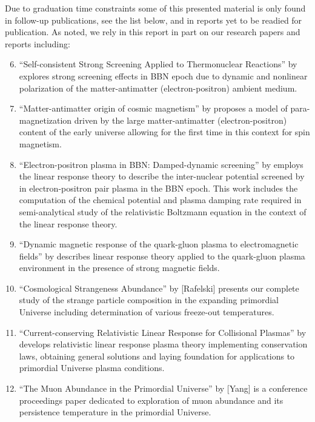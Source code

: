 Due to graduation time constraints some of this presented material is only found in follow-up publications, see the list below, and in reports yet to be readied for publication. As noted, we rely in this report in part on our research papers and reports including:
\begin{enumerate}
\setcounter{enumi}{5}
\item ``Self-consistent Strong Screening Applied to Thermonuclear Reactions'' by  explores strong screening effects in BBN epoch due to dynamic and nonlinear polarization of the matter-antimatter (electron-positron) ambient medium.
%
\item ``Matter-antimatter origin of cosmic magnetism'' by  proposes a model of para-magnetization driven by the large matter-antimatter (electron-positron) content of the early universe allowing for the first time in this context for spin magnetism.
%
\item ``Electron-positron plasma in BBN: Damped-dynamic screening'' by  employs the linear response theory to describe the inter-nuclear potential screened by in electron-positron pair plasma in the BBN epoch. This work includes the computation of the chemical potential and plasma damping rate required in semi-analytical study of the relativistic Boltzmann equation in the context of the linear response theory. 
%
\item ``Dynamic magnetic response of the quark-gluon plasma to electromagnetic fields'' by  describes linear response theory applied to the quark-gluon plasma environment in the presence of strong magnetic fields.
%
\item ``Cosmological Strangeness Abundance'' by [Rafelski] presents our complete study of the strange particle composition in the expanding primordial Universe including determination of various freeze-out temperatures.
%
\item ``Current-conserving Relativistic Linear Response for Collisional Plasmas'' by  develops relativistic linear response plasma theory implementing conservation laws, obtaining general solutions and laying foundation for applications to primordial Universe plasma conditions.
%
\item ``The Muon Abundance in the Primordial Universe'' by [Yang] is a conference proceedings paper dedicated to exploration of muon abundance and its persistence temperature in the primordial Universe. 

\end{enumerate}
